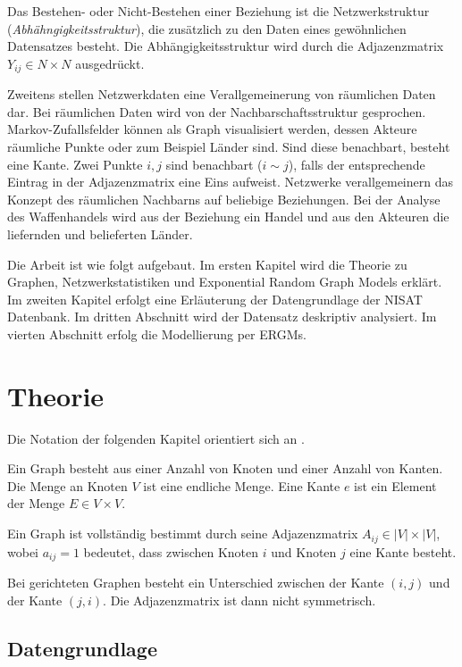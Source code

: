 \documentclass[a4paper,ngerman,oneside,titlepage,11pt]{scrreprt}
\theoremstyle{remark}
\begin{document}
Das Bestehen- oder Nicht-Bestehen einer Beziehung ist die Netzwerkstruktur (\emph{Abhähngigkeitsstruktur}), die zusätzlich zu den Daten eines gewöhnlichen Datensatzes besteht. Die Abhängigkeitsstruktur wird durch die Adjazenzmatrix $Y_{ij} \in N \times N$ ausgedrückt.

Zweitens stellen Netzwerkdaten eine Verallgemeinerung von räumlichen Daten dar. Bei räumlichen Daten wird von der Nachbarschaftsstruktur gesprochen. Markov-Zufallsfelder können als Graph visualisiert werden, dessen Akteure räumliche Punkte oder zum Beispiel Länder sind.
Sind diese benachbart, besteht eine Kante. Zwei Punkte $i, j$ sind benachbart ($i \sim j$), falls der entsprechende Eintrag in der Adjazenzmatrix eine Eins aufweist. Netzwerke verallgemeinern das Konzept des räumlichen Nachbarns auf beliebige Beziehungen. Bei der Analyse des Waffenhandels wird aus der Beziehung ein Handel und aus den Akteuren die liefernden und belieferten Länder.

Die Arbeit ist wie folgt aufgebaut. Im ersten Kapitel wird die Theorie zu Graphen, Netzwerkstatistiken und Exponential Random Graph Models erklärt. Im zweiten Kapitel erfolgt eine Erläuterung der Datengrundlage der NISAT Datenbank. Im dritten Abschnitt wird der Datensatz deskriptiv analysiert. Im vierten Abschnitt erfolg die Modellierung per ERGMs.


\chapter{Theorie}

Die Notation der folgenden Kapitel orientiert sich an \cite{kolaczykR}.

Ein Graph besteht aus einer Anzahl von Knoten und einer Anzahl von Kanten. Die Menge an Knoten $V$ ist eine endliche Menge. Eine Kante $e$ ist ein Element der Menge $E \in V \times V$. 

Ein Graph ist vollständig bestimmt durch seine Adjazenzmatrix $A_{ij} \in |V| \times |V|$, wobei $a_{ij} = 1$ bedeutet, dass zwischen Knoten $i$ und Knoten $j$ eine Kante besteht.

Bei gerichteten Graphen besteht ein Unterschied zwischen der Kante $(i,j)$ und der Kante $(j,i)$. Die Adjazenzmatrix ist dann nicht symmetrisch.





\section{Datengrundlage}
\end{document}

